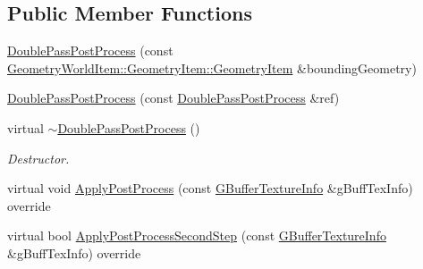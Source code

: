 \subsection*{Public Member Functions}
\begin{DoxyCompactItemize}
\item 
\mbox{\hyperlink{class_geometry_engine_1_1_geometry_post_process_1_1_double_pass_post_process_1_1_double_pass_post_process_aacc7fc7eca98dbfa500035cbacbea78b}{Double\+Pass\+Post\+Process}} (const \mbox{\hyperlink{class_geometry_engine_1_1_geometry_world_item_1_1_geometry_item_1_1_geometry_item}{Geometry\+World\+Item\+::\+Geometry\+Item\+::\+Geometry\+Item}} \&bounding\+Geometry)
\item 
\mbox{\hyperlink{class_geometry_engine_1_1_geometry_post_process_1_1_double_pass_post_process_1_1_double_pass_post_process_acf262889c6fddc54ee4daf2015c2a69f}{Double\+Pass\+Post\+Process}} (const \mbox{\hyperlink{class_geometry_engine_1_1_geometry_post_process_1_1_double_pass_post_process_1_1_double_pass_post_process}{Double\+Pass\+Post\+Process}} \&ref)
\item 
\mbox{\label{class_geometry_engine_1_1_geometry_post_process_1_1_double_pass_post_process_1_1_double_pass_post_process_ae50b64dabbe90930bffb4976785021ed}} 
virtual \mbox{\hyperlink{class_geometry_engine_1_1_geometry_post_process_1_1_double_pass_post_process_1_1_double_pass_post_process_ae50b64dabbe90930bffb4976785021ed}{$\sim$\+Double\+Pass\+Post\+Process}} ()
\begin{DoxyCompactList}\small\item\em Destructor. \end{DoxyCompactList}\item 
virtual void \mbox{\hyperlink{class_geometry_engine_1_1_geometry_post_process_1_1_double_pass_post_process_1_1_double_pass_post_process_a9d2674bc5b237ed2e494d1c88f63d29e}{Apply\+Post\+Process}} (const \mbox{\hyperlink{class_geometry_engine_1_1_g_buffer_texture_info}{G\+Buffer\+Texture\+Info}} \&g\+Buff\+Tex\+Info) override
\item 
virtual bool \mbox{\hyperlink{class_geometry_engine_1_1_geometry_post_process_1_1_double_pass_post_process_1_1_double_pass_post_process_a1caac8d2ec6f65de1bb98edd88ba14c6}{Apply\+Post\+Process\+Second\+Step}} (const \mbox{\hyperlink{class_geometry_engine_1_1_g_buffer_texture_info}{G\+Buffer\+Texture\+Info}} \&g\+Buff\+Tex\+Info) override
\end{DoxyCompactItemize}
